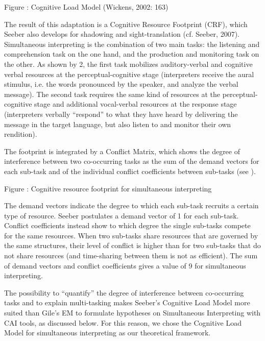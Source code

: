 \documentclass[output=paper]{langsci/langscibook}
\begin{document}
\begin{styleFramecontents}
Figure : Cognitive Load Model (Wickens, 2002: 163)
\end{styleFramecontents}

The result of this adaptation is a Cognitive Resource Footprint (CRF), which Seeber also develops for shadowing and sight-translation (cf. Seeber, 2007). Simultaneous interpreting is the combination of two main tasks: the listening and comprehension task on the one hand, and the production and monitoring task on the other. As shown by 2, the first task mobilizes auditory-verbal and cognitive verbal resources at the perceptual-cognitive stage (interpreters receive the aural stimulus, i.e. the words pronounced by the speaker, and analyze the verbal message). The second task requires the same kind of resources at the perceptual-cognitive stage and additional vocal-verbal resources at the response stage (interpreters verbally “respond” to what they have heard by delivering the message in the target language, but also listen to and monitor their own rendition).

 

The footprint is integrated by a Conflict Matrix, which shows the degree of interference between two co-occurring tasks as the sum of the demand vectors for each sub-task and of the individual conflict coefficients between sub-tasks (see ). 

\begin{styleFramecontents}
\label{bkm:Ref379388483}Figure : Cognitive resource footprint for simultaneous interpreting \citep[1385]{Seeber2007}
\end{styleFramecontents}

The demand vectors indicate the degree to which each sub-task recruits a certain type of resource. Seeber postulates a demand vector of 1 for each sub-task. Conflict coefficients instead show to which degree the single sub-tasks compete for the same resources. When two sub-tasks share resources that are governed by the same structures, their level of conflict is higher than for two sub-tasks that do not share resources (and time-sharing between them is not as efficient). The sum of demand vectors and conflict coefficients gives a value of 9 for simultaneous interpreting.

The possibility to “quantify” the degree of interference between co-occurring tasks and to explain multi-tasking makes Seeber’s Cognitive Load Model more suited than Gile’s EM to formulate hypotheses on Simultaneous Interpreting with CAI tools, as discussed below. For this reason, we chose the Cognitive Load Model for simultaneous interpreting as our theoretical framework.
\end{document}
